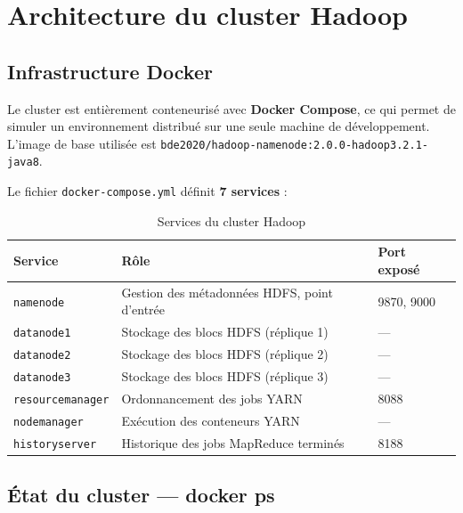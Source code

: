 \documentclass[12pt,a4paper]{article}
\begin{document}
\section{Architecture du cluster Hadoop}
\label{sec:archi}

\subsection{Infrastructure Docker}

Le cluster est entièrement conteneurisé avec \textbf{Docker Compose}, ce qui
permet de simuler un environnement distribué sur une seule machine de
développement. L'image de base utilisée est
\texttt{bde2020/hadoop-namenode:2.0.0-hadoop3.2.1-java8}.

Le fichier \texttt{docker-compose.yml} définit \textbf{7 services} :

\begin{table}[H]
  \centering
  \caption{Services du cluster Hadoop}
  \label{tab:services}
  \begin{tabularx}{\textwidth}{lXl}
    \toprule
    \textbf{Service} & \textbf{Rôle} & \textbf{Port exposé} \\
    \midrule
    \texttt{namenode}        & Gestion des métadonnées HDFS, point d'entrée & 9870, 9000 \\
    \texttt{datanode1}       & Stockage des blocs HDFS (réplique 1)         & ---        \\
    \texttt{datanode2}       & Stockage des blocs HDFS (réplique 2)         & ---        \\
    \texttt{datanode3}       & Stockage des blocs HDFS (réplique 3)         & ---        \\
    \texttt{resourcemanager} & Ordonnancement des jobs YARN                 & 8088       \\
    \texttt{nodemanager}     & Exécution des conteneurs YARN                & ---        \\
    \texttt{historyserver}   & Historique des jobs MapReduce terminés       & 8188       \\
    \bottomrule
  \end{tabularx}
\end{table}

\subsection{État du cluster — docker ps}
\end{document}
